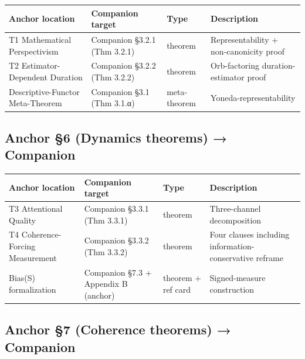 \documentclass[11pt, openany]{book}
\begin{document}
\begingroup\setlength{\tabcolsep}{3pt}\renewcommand{\arraystretch}{1.15}\footnotesize
\begin{center}
\begin{tabular}{p{1.19in} p{1.04in} p{0.58in} p{1.46in}}
\toprule
Anchor location & Companion target & Type & Description \\
\midrule
T1 Mathematical Perspectivism & Companion §3.2.1 (Thm 3.2.1) & theorem & Representability + non-canonicity proof \\
T2 Estimator-Dependent Duration & Companion §3.2.2 (Thm 3.2.2) & theorem & Orb-factoring duration-estimator proof \\
Descriptive-Functor Meta-Theorem & Companion §3.1 (Thm 3.1.α) & meta-theorem & Yoneda-representability \\
\bottomrule
\end{tabular}
\end{center}
\endgroup
\subsection{Anchor §6 (Dynamics theorems) → Companion}

\begingroup\setlength{\tabcolsep}{3pt}\renewcommand{\arraystretch}{1.15}\footnotesize
\begin{center}
\begin{tabular}{p{0.96in} p{1.08in} p{0.59in} p{1.65in}}
\toprule
Anchor location & Companion target & Type & Description \\
\midrule
T3 Attentional Quality & Companion §3.3.1 (Thm 3.3.1) & theorem & Three-channel decomposition \\
T4 Coherence-Forcing Measurement & Companion §3.3.2 (Thm 3.3.2) & theorem & Four clauses including information-conservative reframe \\
Bias(S) formalization & Companion §7.3 + Appendix B (anchor) & theorem + ref card & Signed-measure construction \\
\bottomrule
\end{tabular}
\end{center}
\endgroup
\subsection{Anchor §7 (Coherence theorems) → Companion}
\end{document}
